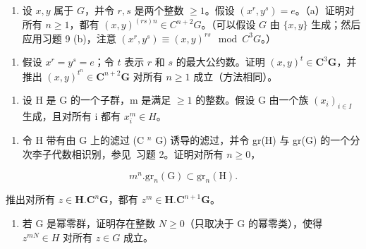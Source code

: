 \begin{enumerate}
\def\labelenumi{\arabic{enumi}.}
\setcounter{enumi}{9}
\tightlist
\item
  设 \(x, y\) 属于 \(G\)，并令 \(r, s\) 是两个整数 \(\geqslant 1\)。假设 \((x^r, y^s) = e\)。（a）证明对所有 \(n \geqslant 1\)，都有 \((x, y)^{(rs)n} \in C^{n+2}G\)。（可以假设 \(G\) 由 \(\{x, y\}\) 生成；然后应用习题 9 (b)，注意 \((x^r, y^s) \equiv (x, y)^{rs} \mod C^3G\)。）
\end{enumerate}

\begin{enumerate}
\def\labelenumi{(\alph{enumi})}
\setcounter{enumi}{1}
\tightlist
\item
  假设 \(x^r = y^s = e\)；令 \(t\) 表示 \(r\) 和 \(s\) 的最大公约数。证明 \((x, y)^t \in \mathbf{C}^3\mathbf{G}\)，并推出 \((x, y)^{t^n} \in \mathbf{C}^{n+2}\mathbf{G}\) 对所有 \(n \geqslant 1\) 成立（方法相同）。
\end{enumerate}

\begin{enumerate}
\def\labelenumi{\arabic{enumi}.}
\setcounter{enumi}{10}
\tightlist
\item
  设 H 是 G 的一个子群，m 是满足 \(\geqslant 1\) 的整数。假设 G 由一个族 \((x_{i})_{i\in I}\) 生成，且对所有 i 都有 \(x_{i}^{m}\in H\)。
\end{enumerate}

\begin{enumerate}
\def\labelenumi{(\alph{enumi})}
\tightlist
\item
  令 H 带有由 G 上的滤过 (C \(^{n}\) G) 诱导的滤过，并令 gr(H) 与 gr(G) 的一个分次李子代数相识别，参见~习题 2。证明对所有 \(n \geqslant 0\)，
\end{enumerate}

\[
m ^ {n}. \mathrm{gr} _ {n} (\mathrm{G}) \subset \mathrm{gr} _ {n} (\mathrm{H}).
\]

推出对所有 \(z \in \mathbf{H}.\mathbf{C}^n\mathbf{G}\)，都有 \(z^m \in \mathbf{H}.\mathbf{C}^{n+1}\mathbf{G}\)。

\begin{enumerate}
\def\labelenumi{(\alph{enumi})}
\setcounter{enumi}{1}
\tightlist
\item
  若 G 是幂零群，证明存在整数 \(N \geqslant 0\)（只取决于 G 的幂零类），使得 \(z^{mN} \in H\) 对所有 \(z \in G\) 成立。
\end{enumerate}

